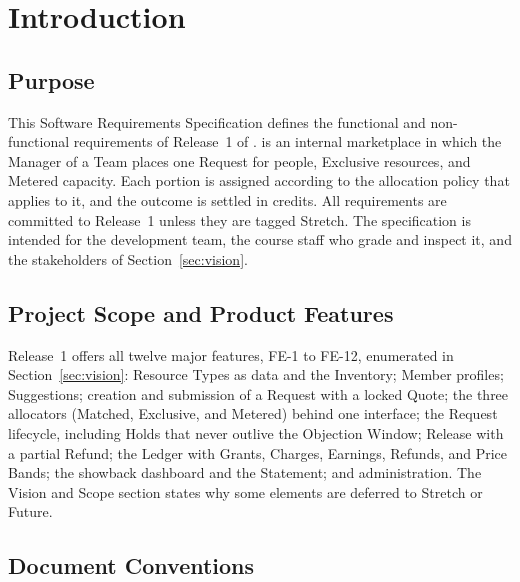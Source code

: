 \section{Introduction}\label{sec:intro}

\subsection{Purpose}

This Software Requirements Specification defines the functional and non-functional requirements of Release~1 of \SRSproduct. \SRSproduct{} is an internal marketplace in which the Manager of a Team places one Request for people, Exclusive resources, and Metered capacity. Each portion is assigned according to the allocation policy that applies to it, and the outcome is settled in credits. All requirements are committed to Release~1 unless they are tagged Stretch. The specification is intended for the development team, the course staff who grade and inspect it, and the stakeholders of Section~\ref{sec:vision}.

\subsection{Project Scope and Product Features}

Release~1 offers all twelve major features, FE-1 to FE-12, enumerated in Section~\ref{sec:vision}: Resource Types as data and the Inventory; Member profiles; Suggestions; creation and submission of a Request with a locked Quote; the three allocators (Matched, Exclusive, and Metered) behind one interface; the Request lifecycle, including Holds that never outlive the Objection Window; Release with a partial Refund; the Ledger with Grants, Charges, Earnings, Refunds, and Price Bands; the showback dashboard and the Statement; and administration. The Vision and Scope section states why some elements are deferred to Stretch or Future.

\subsection{Document Conventions}

